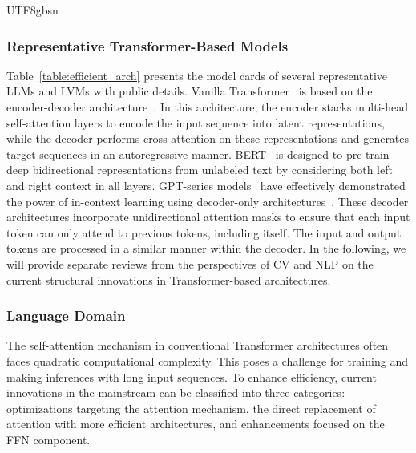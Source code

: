 \documentclass[10pt,journal,compsoc]{IEEEtran}
\newcommand{\<}{\left\langle}
\renewcommand{\>}{\right\rangle}
\newcommand{\1}{\mathbbm{1}}
\begin{document}
\begin{CJK}{UTF8}{gbsn}
\subsubsection{Representative Transformer-Based Models}
Table~\ref{table:efficient_arch} presents the model cards of several representative LLMs and LVMs with public details.
Vanilla Transformer~\cite{vaswani2017attention} is based on the encoder-decoder architecture~\cite{raffel2020exploring}. In this architecture, the encoder stacks multi-head self-attention layers to encode the input sequence into latent representations, while the decoder performs cross-attention on these representations and generates target sequences in an autoregressive manner. BERT~\cite{devlin2018bert} is designed to pre-train deep bidirectional representations from unlabeled text by considering both left and right context in all layers.
GPT-series models~\cite{brown2020language,gpt4} have effectively demonstrated the power of in-context learning using decoder-only architectures~\cite{scao2022bloom,rae2021scaling,penedo2023refinedweb}. These decoder architectures incorporate unidirectional attention masks to ensure that each input token can only attend to previous tokens, including itself. The input and output tokens are processed in a similar manner within the decoder.
In the following, we will provide separate reviews from the perspectives of CV and NLP on the current structural innovations in  Transformer-based architectures.



\subsubsection{Language Domain} %
The self-attention mechanism in conventional Transformer architectures often faces quadratic computational complexity. This poses a challenge for training and making inferences with long input sequences. To enhance efficiency, current innovations in the mainstream can be classified into three categories: optimizations targeting the attention mechanism, the direct replacement of attention with more efficient architectures, and enhancements focused on the FFN component.


\end{CJK}
\end{document}
